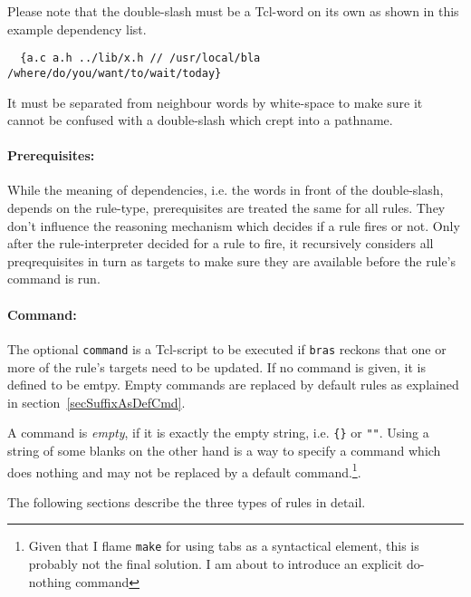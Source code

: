 \documentclass[12pt]{article}
\newcommand{\bras}{\texttt{bras}}
\newcommand{\make}{\texttt{make}}
\begin{document}
Please note that the double-slash must be a Tcl-word on its own as
shown in this example dependency list.
\begin{verbatim}
  {a.c a.h ../lib/x.h // /usr/local/bla /where/do/you/want/to/wait/today}
\end{verbatim}
It must be separated from neighbour words by white-space to make sure
it cannot be confused with a double-slash which crept into a pathname.


\paragraph{Prerequisites:}
While the meaning of dependencies, i.e. the words in front of the
double-slash, depends on the rule-type, prerequisites are treated the
same for all rules. They don't influence the reasoning mechanism which
decides if a rule fires or not. Only after the rule-interpreter
decided for a rule to fire, it recursively considers all
preqrequisites in turn as targets to make sure they are available
before the rule's command is run.

\paragraph{Command:}
The optional \texttt{command} is a Tcl-script to be executed if
\bras{} reckons that one or more of the rule's targets need to be
updated. If no command is given, it is defined to be emtpy. Empty
commands are replaced by default rules as explained in
section~\ref{secSuffixAsDefCmd}. 

A command is \textit{empty}, if it is exactly the empty string,
i.e. \verb+{}+ or \verb+""+. Using a string of some blanks on the
other hand is a way to specify a command which does nothing and may
not be replaced by a default command.\footnote{Given that I flame
\make{} for using tabs as a syntactical element, this is probably not
the final solution. I am about to introduce an explicit do-nothing
command}.

The following sections describe the three types of rules in detail.

\end{document}
